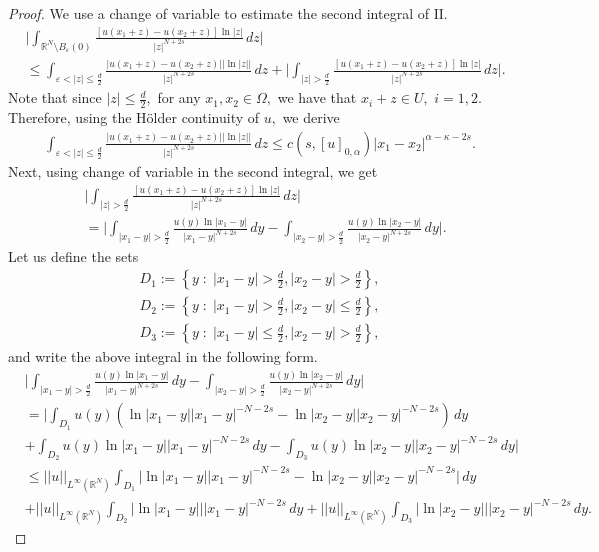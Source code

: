 \documentclass[10pt,a4paper]{amsart}
\newcommand{\RR}{\mathds{R}}
\begin{document}
\begin{proof}
We use a change of variable to estimate the second integral of $\mathrm {II}.$ 
\begin{align*}
&\Bigg|\int_{\RR^N\setminus B_{\varepsilon}(0)}\frac{[u(x_1+z)-u(x_2+z)]\ln |z|}{|z|^{N+2s}}\, dz\bigg|\\
&\le \int_{\varepsilon< |z|\leq \frac{d}{2}}\frac{|u(x_1+z)-u(x_2+z)||\ln |z||}{|z|^{N+2s}}\, dz+\bigg|\int_{|z|>\frac{d}{2}}\frac{[u(x_1+z)-u(x_2+z)]\ln |z|}{|z|^{N+2s}}\, dz\bigg|.
\end{align*}
Note that since $|z|\leq \frac{d}{2},$ for any $x_1, x_2\in \Omega,$ we have that $x_i+z\in U, $ $i=1,2.$ Therefore, using the H\"older continuity of $u, $ we derive
\begin{align*}
 \int_{\varepsilon< |z|\leq \frac{d}{2}}\frac{|u(x_1+z)-u(x_2+z)||\ln |z||}{|z|^{N+2s}}\, dz\leq c(s, [u]_{0, \alpha})|x_1-x_2|^{\alpha-\kappa-2s}.   
\end{align*}
Next, using change of variable in the second integral, we get
\begin{align*}
&\bigg|\int_{|z|>\frac{d}{2}}\frac{[u(x_1+z)-u(x_2+z)]\ln |z|}{|z|^{N+2s}}\, dz\bigg|\\
&=\bigg| \int_{|x_1-y|>\frac{d}{2}}\frac{u(y)\ln |x_1-y|}{|x_1-y|^{N+2s}}\, dy-\int_{|x_2-y|>\frac{d}{2}}\frac{u(y)\ln |x_2-y|}{|x_2-y|^{N+2s}}\, dy\bigg|.
\end{align*}
Let us define the sets
\begin{align*}
    D_1:=\left\{y\;:\; |x_1-y|> \frac{d}{2}, |x_2-y|> \frac{d}{2}\right\},\\
    D_2:=\left\{y\;:\; |x_1-y|> \frac{d}{2}, |x_2-y|\leq \frac{d}{2}\right\},\\
    D_3:=\left\{y\;:\; |x_1-y|\leq \frac{d}{2}, |x_2-y|> \frac{d}{2}\right\},
\end{align*}
and write the above integral in the following form.
\begin{align*}
&\bigg| \int_{|x_1-y|>\frac{d}{2}}\frac{u(y)\ln |x_1-y|}{|x_1-y|^{N+2s}}\, dy-\int_{|x_2-y|>\frac{d}{2}}\frac{u(y)\ln |x_2-y|}{|x_2-y|^{N+2s}}\, dy\bigg|\\
&=\Bigg|\int_{D_1}u(y)(\ln|x_1-y||x_1-y|^{-N-2s}-\ln |x_2-y||x_2-y|^{-N-2s})\, dy\\
&+\int_{D_2}u(y)\ln |x_1-y||x_1-y|^{-N-2s}\, dy-\int_{D_3}u(y)\ln |x_2-y||x_2-y|^{-N-2s}\, dy\Bigg|\\
&\leq||u||_{L^{\infty}(\RR^N)}\int_{D_1}\Big|\ln |x_1-y||x_1-y|^{-N-2s}-\ln |x_2-y||x_2-y|^{-N-2s}\Big|\, dy\\
&+ ||u||_{L^{\infty}(\RR^N)}\int_{D_2}|\ln |x_1-y|||x_1-y|^{-N-2s}\, dy+||u||_{L^{\infty}(\RR^N)}\int_{D_3}|\ln |x_2-y|||x_2-y|^{-N-2s}\, dy.

\end{align*}
\end{proof}
\end{document}
